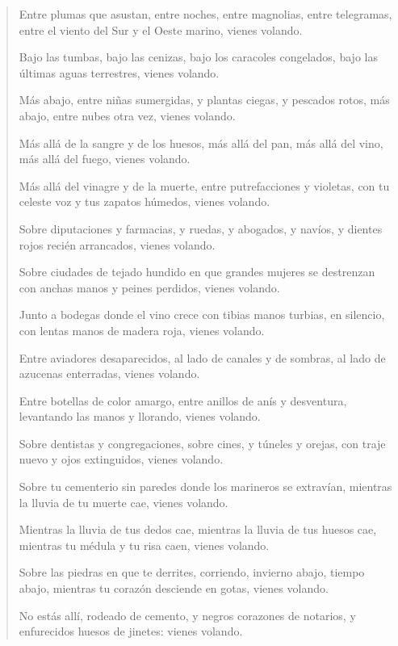 \documentclass[12pt]{article}
\begin{document}
\clearpage
{}
\begin{verse}
Entre plumas que asustan, entre noches,  
entre magnolias, entre telegramas,  
entre el viento del Sur y el Oeste marino,  
vienes volando.  
	
Bajo las tumbas, bajo las cenizas,  
bajo los caracoles congelados,  
bajo las últimas aguas terrestres,  
vienes volando.  
	
Más abajo, entre niñas sumergidas,  
y plantas ciegas, y pescados rotos,  
más abajo, entre nubes otra vez,  
vienes volando.  
	
Más allá de la sangre y de los huesos,  
más allá del pan, más allá del vino,  
más allá del fuego,  
vienes volando.  
	
Más allá del vinagre y de la muerte,  
entre putrefacciones y violetas,  
con tu celeste voz y tus zapatos húmedos,  
vienes volando.  
	
Sobre diputaciones y farmacias,  
y ruedas, y abogados, y navíos,  
y dientes rojos recién arrancados,  
vienes volando.  
	
Sobre ciudades de tejado hundido  
en que grandes mujeres se destrenzan  
con anchas manos y peines perdidos,  
vienes volando.  
	
Junto a bodegas donde el vino crece  
con tibias manos turbias, en silencio,  
con lentas manos de madera roja,  
vienes volando.  
	
Entre aviadores desaparecidos,  
al lado de canales y de sombras,  
al lado de azucenas enterradas,  
vienes volando.  
	
Entre botellas de color amargo,  
entre anillos de anís y desventura,  
levantando las manos y llorando,  
vienes volando.  
	
Sobre dentistas y congregaciones,  
sobre cines, y túneles y orejas,  
con traje nuevo y ojos extinguidos,  
vienes volando.  
	
Sobre tu cementerio sin paredes  
donde los marineros se extravían,  
mientras la lluvia de tu muerte cae,  
vienes volando.  
	
Mientras la lluvia de tus dedos cae,  
mientras la lluvia de tus huesos cae,  
mientras tu médula y tu risa caen,  
vienes volando.  
	
Sobre las piedras en que te derrites,  
corriendo, invierno abajo, tiempo abajo,  
mientras tu corazón desciende en gotas,  
vienes volando.  
	
No estás allí, rodeado de cemento,  
y negros corazones de notarios,  
y enfurecidos huesos de jinetes:  
vienes volando.  
	

\end{verse}
\end{document}
